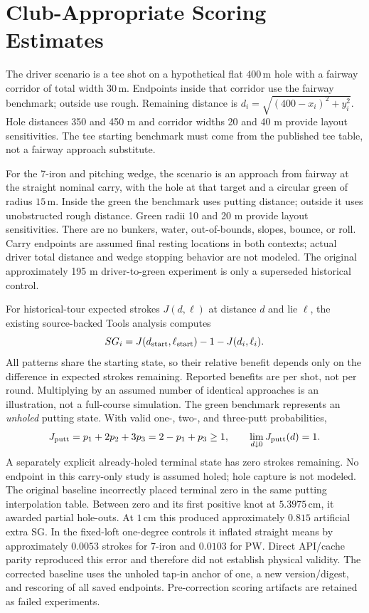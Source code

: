 \documentclass[11pt,letterpaper]{article}
\begin{document}
\section{Club-Appropriate Scoring Estimates}
The driver scenario is a tee shot on a hypothetical flat $400\,\mathrm m$
hole with a fairway corridor of total width $30\,\mathrm m$. Endpoints inside
that corridor use the fairway benchmark; outside use rough. Remaining distance
is $d_i=\sqrt{(400-x_i)^2+y_i^2}$. Hole distances 350 and 450 m and corridor
widths 20 and 40 m provide layout sensitivities. The tee starting benchmark
must come from the published tee table, not a fairway approach substitute.

For the 7-iron and pitching wedge, the scenario is an approach from fairway at
the straight nominal carry, with the hole at that target and a circular green
of radius $15\,\mathrm m$. Inside the green the benchmark uses putting distance;
outside it uses unobstructed rough distance. Green radii 10 and 20 m provide
layout sensitivities. There are no bunkers, water, out-of-bounds, slopes,
bounce, or roll. Carry endpoints are assumed final resting locations in both
contexts; actual driver total distance and wedge stopping behavior are not
modeled. The original approximately 195 m driver-to-green experiment is only
a superseded historical control.

For historical-tour expected strokes $J(d,\ell)$ at distance $d$ and lie
$\ell$, the existing source-backed Tools analysis computes
\[
 SG_i=J(d_{\rm start},\ell_{\rm start})-1-J(d_i,\ell_i).
\]
All patterns share the starting state, so their relative benefit depends only
on the difference in expected strokes remaining. Reported benefits are per
shot, not per round. Multiplying by an assumed number of identical
approaches is an illustration, not a full-course simulation.
The green benchmark represents an \emph{unholed} putting state. With valid
one-, two-, and three-putt probabilities,
\[
 J_{\rm putt}=p_1+2p_2+3p_3=2-p_1+p_3\ge1,
 \qquad \lim_{d\downarrow0}J_{\rm putt}(d)=1.
\]
A separately explicit already-holed terminal state has zero strokes remaining.
No endpoint in this carry-only study is assumed holed; hole capture is not
modeled. The original baseline incorrectly placed terminal zero in the same
putting interpolation table. Between zero and its first positive knot at
$5.3975\,\mathrm{cm}$, it awarded partial hole-outs. At $1\,\mathrm{cm}$ this
produced approximately $0.815$ artificial extra SG. In the fixed-loft one-degree
controls it inflated straight means by approximately $0.0053$ strokes for
7-iron and $0.0103$ for PW. Direct API/cache parity reproduced this error and
therefore did not establish physical validity. The corrected baseline uses the
unholed tap-in anchor of one, a new version/digest, and rescoring of all saved
endpoints. Pre-correction scoring artifacts are retained as failed experiments.
\end{document}
